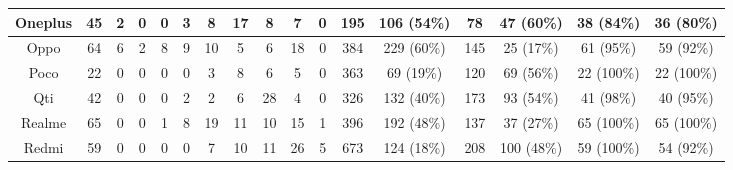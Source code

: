 \begin{table*}[th]
\begin{threeparttable}
{\begin{tabular}{|c|c|ccccccccc|cc|cc|cc|}
Oneplus                & 45                            & \multicolumn{1}{c|}{2}      & \multicolumn{1}{c|}{0}   & \multicolumn{1}{c|}{0}   & \multicolumn{1}{c|}{3}   & \multicolumn{1}{c|}{8}   & \multicolumn{1}{c|}{17}  & \multicolumn{1}{c|}{8}   & \multicolumn{1}{c|}{7}   & 0   & 195          & 106 (54\%)         & 78           & 47 (60\%)          & 38 (84\%)         & 36 (80\%)          \\ \hline
Oppo                   & 64                            & \multicolumn{1}{c|}{6}      & \multicolumn{1}{c|}{2}   & \multicolumn{1}{c|}{8}   & \multicolumn{1}{c|}{9}   & \multicolumn{1}{c|}{10}  & \multicolumn{1}{c|}{5}   & \multicolumn{1}{c|}{6}   & \multicolumn{1}{c|}{18}  & 0   & 384          & 229 (60\%)         & 145          & 25 (17\%)          & 61 (95\%)         & 59 (92\%)          \\ \hline
Poco                   & 22                            & \multicolumn{1}{c|}{0}      & \multicolumn{1}{c|}{0}   & \multicolumn{1}{c|}{0}   & \multicolumn{1}{c|}{0}   & \multicolumn{1}{c|}{3}   & \multicolumn{1}{c|}{8}   & \multicolumn{1}{c|}{6}   & \multicolumn{1}{c|}{5}   & 0   & 363          & 69 (19\%)          & 120          & 69 (56\%)          & 22 (100\%)        & 22 (100\%)         \\ \hline
Qti                    & 42                            & \multicolumn{1}{c|}{0}      & \multicolumn{1}{c|}{0}   & \multicolumn{1}{c|}{0}   & \multicolumn{1}{c|}{2}   & \multicolumn{1}{c|}{2}   & \multicolumn{1}{c|}{6}   & \multicolumn{1}{c|}{28}  & \multicolumn{1}{c|}{4}   & 0   & 326          & 132 (40\%)         & 173          & 93 (54\%)          & 41 (98\%)         & 40 (95\%)          \\ \hline
Realme                 & 65                            & \multicolumn{1}{c|}{0}      & \multicolumn{1}{c|}{0}   & \multicolumn{1}{c|}{1}   & \multicolumn{1}{c|}{8}   & \multicolumn{1}{c|}{19}  & \multicolumn{1}{c|}{11}  & \multicolumn{1}{c|}{10}  & \multicolumn{1}{c|}{15}  & 1   & 396          & 192 (48\%)         & 137          & 37 (27\%)          & 65 (100\%)        & 65 (100\%)         \\ \hline
Redmi                  & 59                            & \multicolumn{1}{c|}{0}      & \multicolumn{1}{c|}{0}   & \multicolumn{1}{c|}{0}   & \multicolumn{1}{c|}{0}   & \multicolumn{1}{c|}{7}   & \multicolumn{1}{c|}{10}  & \multicolumn{1}{c|}{11}  & \multicolumn{1}{c|}{26}  & 5   & 673          & 124 (18\%)         & 208          & 100 (48\%)         & 59 (100\%)        & 54 (92\%)          \\ \hline

\end{tabular}}
\end{threeparttable}
\end{table*}
